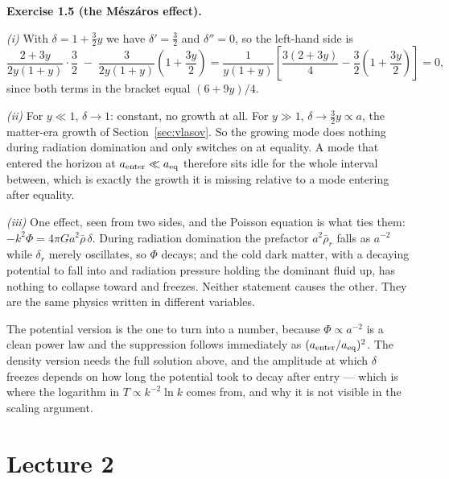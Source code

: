 \documentclass[a4paper,11pt]{article}
\newenvironment{solution}[1]
  {\par\medskip\noindent\textbf{#1}\par\nobreak\smallskip}
  {\par\medskip}
\begin{document}
\begin{solution}{Exercise 1.5 (the M\'esz\'aros effect).}
\emph{(i)} With $\delta = 1 + \tfrac32 y$ we have $\delta' = \tfrac32$ and
$\delta'' = 0$, so the left-hand side is
\begin{equation*}
\frac{2+3y}{2y(1+y)}\cdot\frac32 \;-\; \frac{3}{2y(1+y)}\left(1+\frac{3y}{2}\right)
= \frac{1}{y(1+y)}\left[\frac{3(2+3y)}{4} - \frac{3}{2}\left(1+\frac{3y}{2}\right)\right] = 0 ,
\end{equation*}
since both terms in the bracket equal $(6+9y)/4$.

\emph{(ii)} For $y \ll 1$, $\delta \to 1$: constant, no growth at all. For
$y \gg 1$, $\delta \to \tfrac32 y \propto a$, the matter-era growth of
Section~\ref{sec:vlasov}. So the growing mode does nothing during radiation
domination and only switches on at equality. A mode that entered the horizon at
$a_{\rm enter} \ll a_{\rm eq}$ therefore sits idle for the whole interval
between, which is exactly the growth it is missing relative to a mode entering
after equality.

\emph{(iii)} One effect, seen from two sides, and the Poisson equation is what
ties them: $-k^2\Phi = 4\pi Ga^2\bar\rho\,\delta$. During radiation domination
the prefactor $a^2\bar\rho_r$ falls as $a^{-2}$ while $\delta_r$ merely
oscillates, so $\Phi$ decays; and the cold dark matter, with a decaying
potential to fall into and radiation pressure holding the dominant fluid up,
has nothing to collapse toward and freezes. Neither statement causes the other.
They are the same physics written in different variables.

The potential version is the one to turn into a number, because $\Phi \propto
a^{-2}$ is a clean power law and the suppression follows immediately as
$(a_{\rm enter}/a_{\rm eq})^2$. The density version needs the full solution
above, and the amplitude at which $\delta$ freezes depends on how long the
potential took to decay after entry --- which is where the logarithm in
$T \propto k^{-2}\ln k$ comes from, and why it is not visible in the scaling
argument.
\end{solution}

\section*{Lecture 2}
\end{document}
